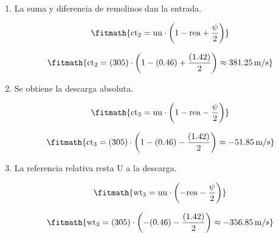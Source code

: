 \begin{enumerate}

\item La suma y diferencia de remolinos dan la entrada.

\[\fitmath{\mathrm{ct}_{2}=\mathrm{uu}\cdot \left(1-\mathrm{rea}+\frac{\psi}{2}\right)}\]

\[\fitmath{\mathrm{ct}_{2}=(305)\cdot \left(1-(0.46)+\frac{(1.42)}{2}\right)\approx 381.25\,\mathrm{m/s}}\]

\item Se obtiene la descarga absoluta.

\[\fitmath{\mathrm{ct}_{3}=\mathrm{uu}\cdot \left(1-\mathrm{rea}-\frac{\psi}{2}\right)}\]

\[\fitmath{\mathrm{ct}_{3}=(305)\cdot \left(1-(0.46)-\frac{(1.42)}{2}\right)\approx -51.85\,\mathrm{m/s}}\]

\item La referencia relativa resta U a la descarga.

\[\fitmath{\mathrm{wt}_{3}=\mathrm{uu}\cdot \left(-\mathrm{rea}-\frac{\psi}{2}\right)}\]

\[\fitmath{\mathrm{wt}_{3}=(305)\cdot \left(-(0.46)-\frac{(1.42)}{2}\right)\approx -356.85\,\mathrm{m/s}}\]

\end{enumerate}
